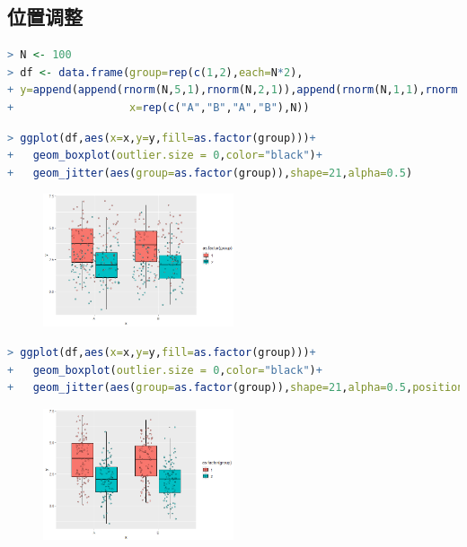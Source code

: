 \documentclass[11pt,a4paper,oneside]{book}
\begin{document}
\subsection{位置调整}
\begin{lstlisting}[language=r]
> N <- 100
> df <- data.frame(group=rep(c(1,2),each=N*2),
+ y=append(append(rnorm(N,5,1),rnorm(N,2,1)),append(rnorm(N,1,1),rnorm(N,3,1))),
+                  x=rep(c("A","B","A","B"),N))
\end{lstlisting}
\begin{lstlisting}[language=r]
> ggplot(df,aes(x=x,y=y,fill=as.factor(group)))+
+   geom_boxplot(outlier.size = 0,color="black")+
+   geom_jitter(aes(group=as.factor(group)),shape=21,alpha=0.5)
\end{lstlisting}
\begin{figure}[H]
	\centering
	\includegraphics[width=0.5\textwidth]{screenshot039}
\end{figure}

\begin{lstlisting}[language=r]
> ggplot(df,aes(x=x,y=y,fill=as.factor(group)))+
+   geom_boxplot(outlier.size = 0,color="black")+
+   geom_jitter(aes(group=as.factor(group)),shape=21,alpha=0.5,position = position_jitterdodge())
\end{lstlisting}
\begin{figure}[H]
	\centering
	\includegraphics[width=0.5\textwidth]{screenshot040}
\end{figure}
\end{document}
